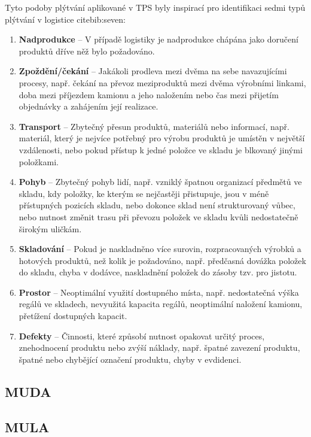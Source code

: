 Tyto podoby plýtvání aplikované v TPS byly inspirací pro identifikaci sedmi typů plýtvání v logistice cite{bib:seven}:
\begin{enumerate}
    \item \textbf{Nadprodukce} -- V případě logistiky je nadprodukce chápána jako doručení produktů dříve něž bylo požadováno.
    \item \textbf{Zpoždění/čekání} -- Jakákoli prodleva mezi dvěma na sebe navazujícími procesy, např. čekání na převoz meziproduktů mezi dvěma výrobními linkami, doba mezi příjezdem kamionu a jeho naložením nebo čas mezi přijetím objednávky a zahájením její realizace. 
    \item \textbf{Transport} -- Zbytečný přesun produktů, materiálů nebo informací, např. materiál, který je nejvíce potřebný pro výrobu produktů je umístěn v největší vzdálenosti, nebo pokud přístup k jedné položce ve skladu je blkovaný jinými položkami.
    \item \textbf{Pohyb} -- Zbytečný pohyb lidí, např. vzniklý špatnou organizací předmětů ve skladu, kdy položky, ke kterým se nejčastěji přistupuje, jsou v méně přístupných pozicích skladu, nebo dokonce sklad není strukturovaný vůbec, nebo nutnost změnit trasu při převozu položek ve skladu kvůli nedostatečně širokým uličkám.
    \item \textbf{Skladování} -- Pokud je naskladněno více surovin, rozpracovaných výrobků a hotových produktů, než kolik je požadováno, např. předčasná dovážka položek do skladu, chyba v dodávce, naskladnění položek do zásoby tzv. pro jistotu.
    \item \textbf{Prostor} -- Neoptimální využití dostupného místa, např. nedostatečná výška regálů ve skladech, nevyužitá kapacita regálů, neoptimální naložení kamionu, přetížení dostupných kapacit.
    \item \textbf{Defekty} -- Činnosti, které způsobí nutnost opakovat určitý proces, znehodnocení produktu nebo zvýší náklady, např. špatné zavezení produktu, špatné nebo chybějící označení produktu, chyby v evdidenci.
\end{enumerate}


\subsection*{MUDA}
\subsection*{MULA}